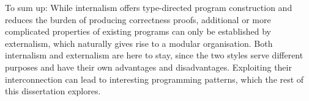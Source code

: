 To sum up:
While internalism offers type-directed program construction and reduces the burden of producing correctness proofs, additional or more complicated properties of existing programs can only be established by externalism, which naturally gives rise to a modular organisation.
Both internalism and externalism are here to stay, since the two styles serve different purposes and have their own advantages and disadvantages.
Exploiting their interconnection can lead to interesting programming patterns, which the rest of this dissertation explores.

